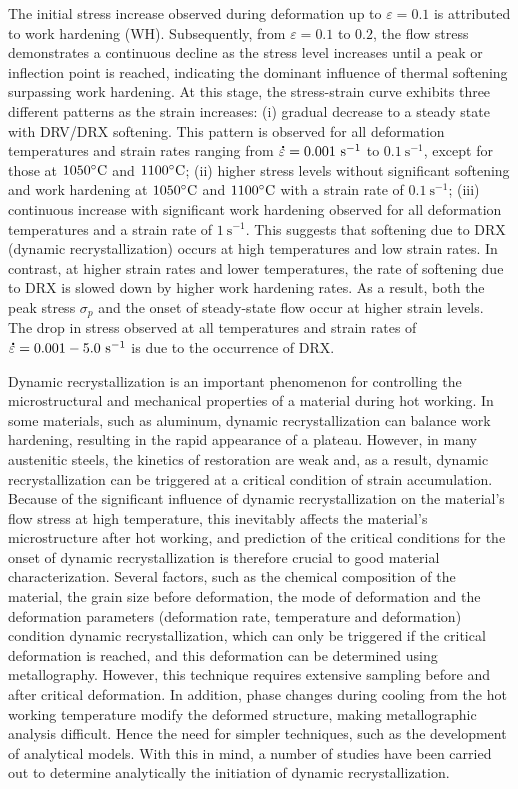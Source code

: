 \documentclass[metals,article,submit,pdftex,moreauthors]{Definitions/mdpi}
\DeclareRobustCommand{\mdot}[1]{\accentset{\mbox{\bfseries .}}{#1}}
\DeclareRobustCommand{\ps}{\text{s}^{-1}}
\begin{document}
The initial stress increase observed during deformation up to $\varepsilon=0.1$ is attributed to work hardening (WH).
Subsequently, from $\varepsilon=0.1$ to $0.2$, the flow stress demonstrates a continuous decline as the stress level increases until a peak or inflection point is reached, indicating the dominant influence of thermal softening surpassing work hardening.
At this stage, the stress-strain curve exhibits three different patterns as the strain increases: (i) gradual decrease to a steady state with DRV/DRX softening.
This pattern is observed for all deformation temperatures and strain rates ranging from $\mdot\varepsilon=0.001~\ps$ to $0.1~\ps$, except for those at $1050\celsius$ and $1100\celsius$; (ii) higher stress levels without significant softening and work hardening at $1050\celsius$ and $1100\celsius$ with a strain rate of $0.1~\ps$; (iii) continuous increase with significant work hardening observed for all deformation temperatures and a strain rate of $1~\ps$.
This suggests that softening due to DRX (dynamic recrystallization) occurs at high temperatures and low strain rates.
In contrast, at higher strain rates and lower temperatures, the rate of softening due to DRX is slowed down by higher work hardening rates.
As a result, both the peak stress $\sigma_p$ and the onset of steady-state flow occur at higher strain levels.
The drop in stress observed at all temperatures and strain rates of $\mdot\varepsilon=0.001-5.0~\ps$ is due to the occurrence of DRX.

Dynamic recrystallization is an important phenomenon for controlling the microstructural and mechanical properties of a material during hot working.
In some materials, such as aluminum, dynamic recrystallization can balance work hardening, resulting in the rapid appearance of a plateau.
However, in many austenitic steels, the kinetics of restoration are weak and, as a result, dynamic recrystallization can be triggered at a critical condition of strain accumulation.
Because of the significant influence of dynamic recrystallization on the material's flow stress at high temperature, this inevitably affects the material's microstructure after hot working, and prediction of the critical conditions for the onset of dynamic recrystallization is therefore crucial to good material characterization.
Several factors, such as the chemical composition of the material, the grain size before deformation, the mode of deformation and the deformation parameters (deformation rate, temperature and deformation) condition dynamic recrystallization, which can only be triggered if the critical deformation is reached, and this deformation can be determined using metallography.
However, this technique requires extensive sampling before and after critical deformation.
In addition, phase changes during cooling from the hot working temperature modify the deformed structure, making metallographic analysis difficult.
Hence the need for simpler techniques, such as the development of analytical models.
With this in mind, a number of studies have been carried out to determine analytically the initiation of dynamic recrystallization.
\end{document}
